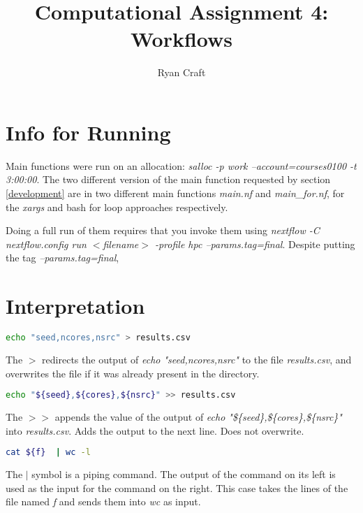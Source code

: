 \documentclass{article}
\begin{document}
	\noindent
	\title{Computational Assignment 4: Workflows}
	\author{Ryan Craft}
    \maketitle 
    
    \section{Info for Running}
    
    Main functions were run on an allocation: \textit{salloc -p work --account=courses0100 -t 3:00:00}.
    The two different version of the main function requested by section \ref{development} are in two different main functions \textit{main.nf} and \textit{main\_for.nf}, for the \textit{xargs} and bash for loop approaches respectively.
    
    Doing a full run of them requires that you invoke them using \textit{nextflow -C nextflow.config run $<$filename$>$ -profile hpc --params.tag=final}.
    Despite putting the tag \textit{--params.tag=final}, 
    
    
    \section{Interpretation}
    
\begin{lstlisting}[language=bash]
	echo "seed,ncores,nsrc" > results.csv
\end{lstlisting}
	The $>$ redirects the output of \textit{echo "seed,ncores,nsrc"} to the file \textit{results.csv}, and overwrites the file if it was already present in the directory.
	
\begin{lstlisting}[language=bash]
	echo "${seed},${cores},${nsrc}" >> results.csv
\end{lstlisting}	
    The $>>$ appends the value of the output of \textit{echo "\$\{seed\},\$\{cores\},\$\{nsrc\}"} into \textit{results.csv}. Adds the output to the next line. Does not overwrite.
    
\begin{lstlisting}[language=bash]
	cat ${f}  | wc -l
\end{lstlisting}
    The $|$ symbol is a piping command. The output of the command on its left is used as the input for the command on the right. This case takes the lines of the file named \textit{f} and sends them into \textit{wc} as input.
    
\end{document}
